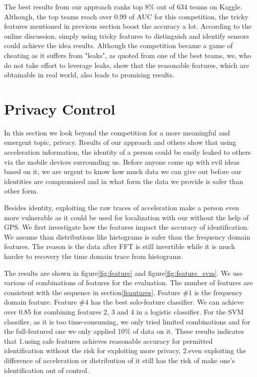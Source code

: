 \documentclass{article} %
\begin{document}
The best results from our approach ranks top 8\% out of 634 teams on Kaggle. Although, the top teams reach over 0.99 of AUC for this competition, the tricky features mentioned in previous section boost the accuracy a lot. According to the online discussion, simply using tricky features to distinguish and identify sensors could achieve the idea results. Although the competition became a game of cheating as it suffers from  "leaks", as quoted from one of the best teams, we, who do not take effort to leverage leaks, show that the reasonable features, which are obtainable in real world, also leads to promising results.

\section{Privacy Control}
In this section we look beyond the competition for a more meaningful and emergent topic, privacy. Results of our approach and others show that using acceleration information, the identity of a person could be easily leaked to others via the mobile devices surrounding us. Before anyone come up with evil ideas based on it, we are urgent to know how much data we can give out before our identities are compromised and in what form the data we provide is safer than other form.

Besides identity, exploiting the raw traces of acceleration make a person even more vulnerable as it could be used for localization with our without the help of GPS. We first investigate how the features impact the accuracy of identification. We assume than distributions like histograms is safer than the frequency domain features. The reason is the data after FFT is still invertible while it is much harder to recovery the time domain trace from histograms. 

The results are shown in figure\ref{fig:feature} and figure\ref{fig:feature_svm}. We use various of combinations of features for the evaluation. The number of features are consistent with the sequence in section\ref{feautures}. Feature \#1 is the frequency domain feature.  Feature \#4 has the best solo-feature classifier. We can achieve over 0.85 for combining features 2, 3 and 4 in a logistic classifier. For the SVM classifier, as it is too time-consuming, we only tried limited combinations and for the full-featured one we only applied 10\% of data on it. These results indicates that 1.using safe features achieves reasonable accuracy for permitted identification without the risk for exploiting more privacy, 2.even exploiting the difference of acceleration or distribution of it still has the risk of make one's identification out of control.
\end{document}
